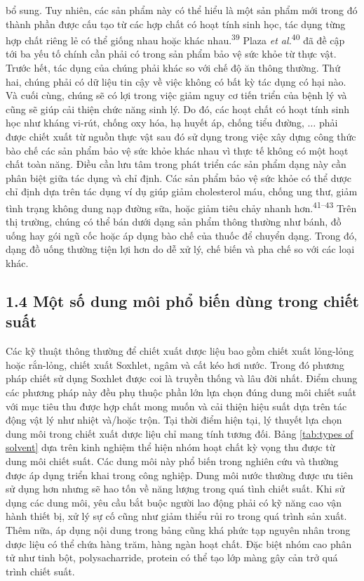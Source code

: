 \documentclass[
  letterpaper,
  DIV=11,
  numbers=noendperiod]{scrartcl}
\begin{document}
bổ sung. Tuy nhiên, các sản phẩm này có thể hiểu là một sản phẩm mới
trong đó thành phần được cấu tạo từ các hợp chất có hoạt tính sinh học,
tác dụng từng hợp chất riêng lẻ có thể giống nhau hoặc khác
nhau.\textsuperscript{39} Plaza \emph{et al.}\textsuperscript{40} đã đề
cập tới ba yếu tố chính cần phải có trong sản phẩm bảo vệ sức khỏe từ
thực vật. Trước hết, tác dụng của chúng phải khác so với chế độ ăn thông
thường. Thứ hai, chúng phải có dữ liệu tin cậy về việc không có bất kỳ
tác dụng có hại nào. Và cuối cùng, chúng sẽ có lợi trong việc giảm nguy
cơ tiến triển của bệnh lý và cũng sẽ giúp cải thiện chức năng sinh lý.
Do đó, các hoạt chất có hoạt tính sinh học như kháng vi-rút, chống oxy
hóa, hạ huyết áp, chống tiểu đường, \(\ldots\) phải được chiết xuất từ
nguồn thực vật sau đó sử dụng trong việc xây dựng công thức bào chế các
sản phẩm bảo vệ sức khỏe khác nhau vì thực tế không có một hoạt chất
toàn năng. Điều cần lưu tâm trong phát triển các sản phẩm dạng này cần
phân biệt giữa tác dụng và chỉ định. Các sản phẩm bảo vệ sức khỏe có thể
dược chỉ định dựa trên tác dụng ví dụ giúp giảm cholesterol máu, chống
ung thư, giảm tình trạng không dung nạp đường sữa, hoặc giảm tiêu chảy
nhanh hơn.\textsuperscript{41--43} Trên thị trường, chúng có thể bán
dưới dạng sản phẩm thông thường như bánh, đồ uống hay gói ngũ cốc hoặc
áp dụng bào chế của thuốc để chuyển dạng. Trong đó, dạng đồ uống thường
tiện lợi hơn do dễ xử lý, chế biến và pha chế so với các loại khác.

\subsection{1.4 Một số dung môi phổ biến dùng trong chiết
suất}\label{mux1ed9t-sux1ed1-dung-muxf4i-phux1ed5-biux1ebfn-duxf9ng-trong-chiux1ebft-suux1ea5t}

Các kỹ thuật thông thường để chiết xuất dược liệu bao gồm chiết xuất
lỏng-lỏng hoặc rắn-lỏng, chiết xuất Soxhlet, ngâm và cất kéo hơi nước.
Trong đó phương pháp chiết sử dụng Soxhlet được coi là truyền thống và
lâu đời nhất. Điểm chung các phương pháp này đều phụ thuộc phần lớn lựa
chọn đúng dung môi chiết suất với mục tiêu thu được hợp chất mong muốn
và cải thiện hiệu suất dựa trên tác động vật lý như nhiệt và/hoặc trộn.
Tại thời điểm hiện tại, lý thuyết lựa chọn dung môi trong chiết xuất
dược liệu chỉ mang tính tương đối. Bảng
\hyperref[tab:typesux5cux2520ofux5cux2520solvent]{{[}tab:types of
solvent{]}} dựa trên kinh nghiệm thể hiện nhóm hoạt chất kỳ vọng thu
được từ dung môi chiết suất. Các dung môi này phổ biến trong nghiên cứu
và thường được áp dụng triển khai trong công nghiệp. Dung môi nước
thường được ưu tiên sử dụng hơn nhưng sẽ hao tốn về năng lượng trong quá
tình chiết suất. Khi sử dụng các dung môi, yêu cầu bắt buộc người lao
động phải có kỹ năng cao vận hành thiết bị, xử lý sự cố cũng như giảm
thiểu rủi ro trong quá trình sản xuất. Thêm nữa, áp dụng nội dung trong
bảng cũng khá phức tạp nguyên nhân trong dược liệu có thể chứa hàng
trăm, hàng ngàn hoạt chất. Đặc biệt nhóm cao phân tử như tinh bột,
polysacharride, protein có thể tạo lớp màng gây cản trở quá trình chiết
suất.
\end{document}
